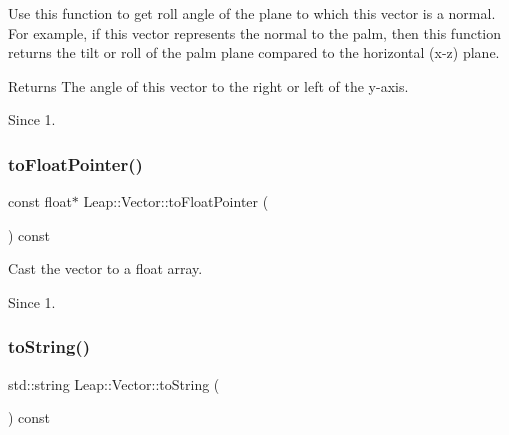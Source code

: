 Use this function to get roll angle of the plane to which this vector is a normal. For example, if this vector represents the normal to the palm, then this function returns the tilt or roll of the palm plane compared to the horizontal (x-\/z) plane.


\begin{DoxyCodeInclude}
\end{DoxyCodeInclude}


\begin{DoxyReturn}{Returns}
The angle of this vector to the right or left of the y-\/axis. 
\end{DoxyReturn}
\begin{DoxySince}{Since}
1. 
\end{DoxySince}
\mbox{\label{struct_leap_1_1_vector_a171112c7b5074572356a7b6fab788ca2}} 
\subsubsection{\texorpdfstring{to\+Float\+Pointer()}{toFloatPointer()}}
{\footnotesize\ttfamily const float$\ast$ Leap\+::\+Vector\+::to\+Float\+Pointer (\begin{DoxyParamCaption}{ }\end{DoxyParamCaption}) const\hspace{0.3cm}{\ttfamily [inline]}}

Cast the vector to a float array.


\begin{DoxyCodeInclude}
\end{DoxyCodeInclude}
 \begin{DoxySince}{Since}
1. 
\end{DoxySince}
\mbox{\label{struct_leap_1_1_vector_a39a0f655940e0e45f97ea1856f630629}} 
\subsubsection{\texorpdfstring{to\+String()}{toString()}}
{\footnotesize\ttfamily std\+::string Leap\+::\+Vector\+::to\+String (\begin{DoxyParamCaption}{ }\end{DoxyParamCaption}) const\hspace{0.3cm}{\ttfamily [inline]}}

